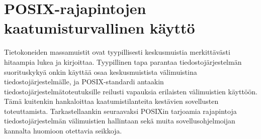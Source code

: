 
\section{POSIX-rajapintojen kaatumisturvallinen käyttö}
\label{ChapPosixDataConsistency}
Tietokoneiden massamuistit ovat tyypillisesti keskusmuistia merkittävästi hitaampia lukea ja kirjoittaa.
Tyypillinen tapa parantaa tiedostojärjestelmän suorituskykyä onkin käyttää osaa keskusmuistista välimuistina tiedostojärjestelmälle,
ja POSIX-standardi antaakin tiedostojärjestelmätoteutuksille reilusti vapauksia erilaisten välimuistien käyttöön.
Tämä kuitenkin hankaloittaa kaatumistilanteita kestävien sovellusten toteuttamista.
Tarkastellaankin seuraavaksi POSIXin tarjoamia rajapintoja tiedostojärjestelmän välimuistien hallintaan sekä muita sovellusohjelmoijan kannalta huomioon otettavia seikkoja.


